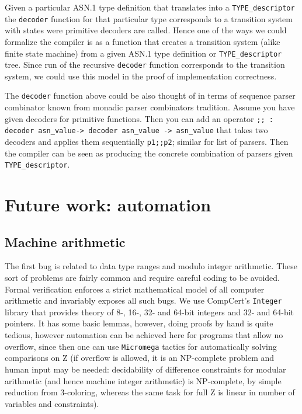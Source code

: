 \documentclass[acmsmall,nonacm]{acmart}
\begin{document}
Given a particular ASN.1 type definition that translates into a \texttt{TYPE\_descriptor} the \texttt{decoder} function for that particular type corresponds to a transition system with states were primitive decoders are called. Hence one of the ways we could formalize the compiler is as a function that creates a transition system (alike finite state machine) from a given ASN.1 type definition or \texttt{TYPE\_descriptor} tree. Since run of the recursive \texttt{decoder} function corresponds to the transition system, we could use this model in the proof of implementation correctness.

The \texttt{decoder} function above could be also thought of in terms of sequence parser combinator known from monadic parser combinators tradition\cite{TODO}. Assume you have given decoders for primitive functions. Then you can add an operator \texttt{;; : decoder asn\_value-> decoder asn\_value -> asn\_value} that takes two decoders and applies them sequentially \texttt{p1;;p2}; similar for list of parsers. Then the compiler can be seen as producing the concrete combination of parsers given \texttt{TYPE\_descriptor}.   


\section{Future work: automation}


\subsection{Machine arithmetic}

The first bug is related to data type ranges and modulo integer
arithmetic. These sort of problems are fairly common and require
careful coding to be avoided. Formal verification enforces a strict
mathematical model of all computer arithmetic and invariably exposes
all such bugs. We use CompCert's \texttt{Integer} library that
provides theory of 8-, 16-, 32- and 64-bit integers and 32- and 64-bit
pointers. It has some basic lemmas, however, doing proofs by hand is
quite tedious, however automation can be achieved here for programs
that allow no overflow, since then one can use
\texttt{Micromega}
tactics for automatically solving comparisons on Z (if overflow is
allowed, it is an NP-complete problem and human input may be needed:
decidability of difference constraints for modular arithmetic (and
hence machine integer arithmetic) is NP-complete, by simple reduction
from 3-coloring\cite{PointerConstraintsNP}, whereas the same task for
full Z is linear in number of variables and constraints).
\end{document}
